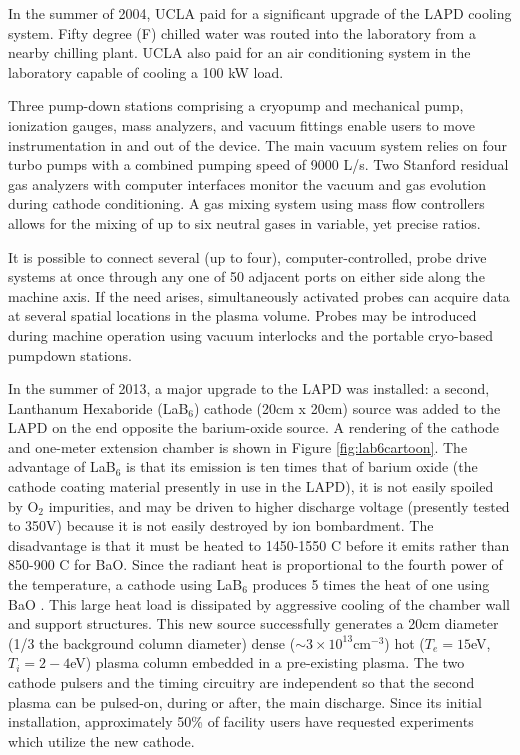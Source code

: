 \documentclass[11pt]{article}
\begin{document}
	In the summer of 2004, UCLA paid for a significant upgrade of the LAPD cooling system.  Fifty degree (F) chilled water was routed into the laboratory from a nearby chilling plant.  UCLA also paid for an air conditioning system in the laboratory capable of cooling a 100 kW load. 

Three pump-down stations comprising a cryopump and mechanical pump, ionization gauges, mass analyzers, and vacuum fittings enable users to move instrumentation in and out of the device.  The main vacuum system relies on four turbo pumps with a combined pumping speed of 9000 L/s.  Two Stanford residual gas analyzers with computer interfaces monitor the vacuum and gas evolution during cathode conditioning.   A gas mixing system using mass flow controllers allows for the mixing of up to six neutral gases in variable, yet precise ratios.

		It is possible to connect several (up to four), computer-controlled, probe drive systems at once through any one of 50 adjacent ports on either side along the machine axis.  If the need arises, simultaneously activated probes can acquire data at several spatial locations in the plasma volume.  Probes may be introduced during machine operation using vacuum interlocks and the portable cryo-based pumpdown stations. 
		
		
		In the summer of 2013, a major upgrade to the LAPD was installed: a second, Lanthanum Hexaboride (LaB$_{6}$) cathode (20cm x 20cm)  source was added to the LAPD on the end opposite the barium-oxide source. A rendering of the cathode and one-meter extension chamber is shown in Figure \ref{fig:lab6cartoon}. The advantage of LaB$_{6}$ is that its emission is ten times that of barium oxide (the cathode coating material presently in use in the LAPD), it is not easily spoiled by O$_{2}$ impurities, and may be driven to higher discharge voltage (presently tested to 350V) because it is not easily destroyed by ion bombardment.  The disadvantage is that it must be heated to 1450-1550 C before it emits rather than 850-900 C for BaO.  Since the radiant heat is proportional to the fourth power of the temperature, a cathode using LaB$_{6}$ produces 5 times the heat of one using BaO .  This large heat load is dissipated by aggressive cooling of the chamber wall and support structures.   This new source successfully generates a 20cm diameter (1/3 the background column diameter) dense ($\sim 3\times 10^{13}$cm$^{-3}$) hot ($T_{e}=15$eV, $T_{i}=2-4$eV) plasma column embedded in a pre-existing plasma.  The two cathode pulsers and the timing circuitry are independent so that the second plasma can be pulsed-on, during or after, the main discharge. Since its initial installation, approximately 50\% of facility users have requested experiments which utilize the new cathode.
\end{document}
